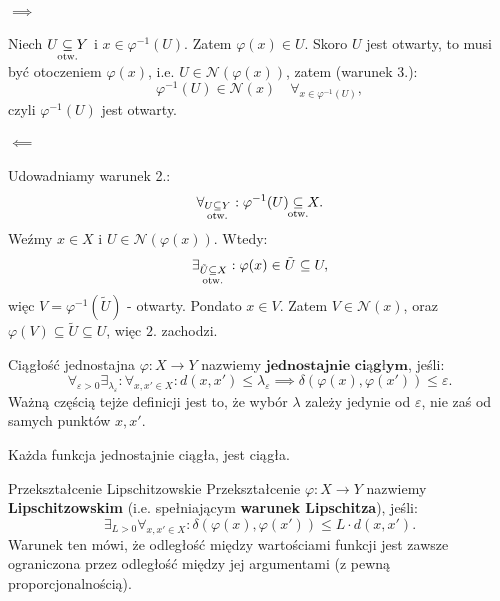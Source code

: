 \documentclass{article}
\newcounter{defi}
\numberwithin{defi}{section}
\numberwithin{defi}{section}
\newcommand{\Nau}{\mathcal{N}}
\newcommand{\subotw}{\underset{\clap{\scriptsize otw.}}{\subseteq}}
\providecommand{\eps}{\varepsilon}
\begin{document}
    \begin{dow}
        \paragraph{$\implies$} Niech $U \subotw Y$ i $x \in \varphi^{-1}(U)$. Zatem $\varphi(x) \in U$. Skoro $U$ jest otwarty, to musi być otoczeniem $\varphi(x)$, i.e. $U \in \Nau(\varphi(x))$, zatem (warunek 3.): \begin{equation*}
            \varphi^{-1}(U) \in \Nau(x) \quad \forall_{x \in \varphi^{-1}(U)},
        \end{equation*} czyli $\varphi^{-1}(U)$ jest otwarty.

        \paragraph{$\impliedby$} Udowadniamy warunek 2.:\begin{equation*}
            \forall_{U \subotw Y}: \varphi^{-1}(U) \subotw X.
        \end{equation*} Weźmy $x \in X$ i $U \in \Nau(\varphi(x))$. Wtedy: \begin{equation*}
            \exists_{\tilde{U} \subotw X}: \varphi(x) \in \tilde{U} \subseteq U,
        \end{equation*} więc $V = \varphi^{-1}(\tilde{U})$ - otwarty. Pondato $x \in V$. Zatem $V \in \Nau(x)$, oraz $\varphi(V) \subseteq \tilde{U} \subseteq U$, więc $2.$ zachodzi.
    \end{dow}


    \begin{defr} {Ciągłość jednostajna} \label{defr:ciaglosc-jednostajna}
        $\varphi: X \to Y$ nazwiemy $\textbf{jednostajnie ciągłym}$, jeśli: \begin{equation}
            \forall_{\eps > 0} \exists_{\lambda_\eps}: \forall_{x, x' \in X}: d(x, x') \leqslant \lambda_\eps \implies \delta(\varphi(x), \varphi(x')) \leqslant \eps.
        \end{equation}
        Ważną częścią tejże definicji jest to, że wybór $\lambda$ zależy jedynie od $\eps$, nie zaś od samych punktów $x, x'$.
    \end{defr} 

    \begin{obs}{}
        Każda funkcja jednostajnie ciągła, jest ciągła.
    \end{obs}

    \begin{defr}{Przekształcenie Lipschitzowskie}
        Przekształcenie $\varphi: X \to Y$ nazwiemy \textbf{Lipschitzowskim} (i.e. spełniającym \textbf{warunek Lipschitza}), jeśli:\begin{equation}
            \exists_{L > 0} \forall_{x, x' \in X}: \delta(\varphi(x), \varphi(x')) \leqslant L \cdot d(x, x').
        \end{equation} Warunek ten mówi, że odległość między wartościami funkcji jest zawsze ograniczona przez odległość między jej argumentami (z pewną proporcjonalnością).
    \end{defr}
\end{document}
